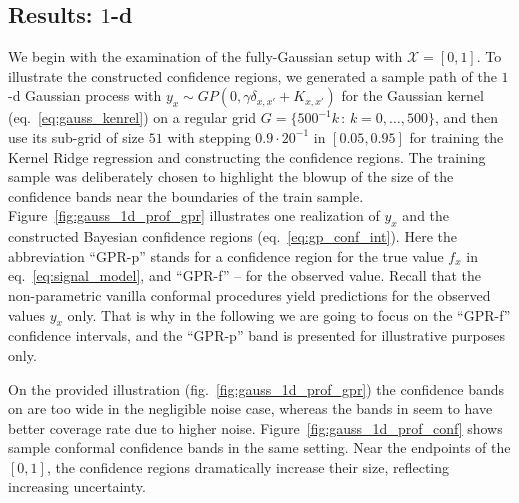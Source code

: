 \documentclass[a4paper,14pt]{extarticle}
\newcommand{\Xcal}{\mathcal{X}}
\begin{document}

\subsection{Results: $1$-d} %
\label{sub:results_1_d}

We begin with the examination of the fully-Gaussian setup with $\Xcal = [0, 1]$.
To illustrate the constructed confidence regions, we generated a sample path of
the $1$-d Gaussian process with $y_x\sim GP(0, \gamma \delta_{x,x'} + K_{x,x'})$
for the Gaussian kernel (eq.~\ref{eq:gauss_kenrel}) on a regular grid $G=\{500^{-1} k \,:\, k=0,
\ldots, 500\}$, and then use its sub-grid of size $51$ with stepping $0.9\cdot 20^{-1}$
in $[0.05, 0.95]$ for training the Kernel Ridge regression and constructing the
confidence regions. The training sample was deliberately chosen to highlight the
blowup of the size of the confidence bands near the boundaries of the train sample.
Figure~\ref{fig:gauss_1d_prof_gpr} illustrates one realization of $y_x$ and the
constructed Bayesian confidence regions (eq.~\ref{eq:gp_conf_int}). Here the abbreviation
``GPR-p'' stands for a confidence region for the true value $f_x$ in eq.~\ref{eq:signal_model},
and ``GPR-f'' -- for the observed value. Recall that the non-parametric vanilla
conformal procedures yield predictions for the observed values $y_x$ only. That
is why in the following we are going to focus on the ``GPR-f'' confidence intervals,
and the ``GPR-p'' band is presented for illustrative purposes only.

On the provided illustration (fig.~\ref{fig:gauss_1d_prof_gpr}) the confidence bands
on are too wide in the negligible noise case, whereas the bands in seem to have better
coverage rate due to higher noise. Figure~\ref{fig:gauss_1d_prof_conf} shows sample
conformal confidence bands in the same setting. Near the endpoints of the $[0,1]$,
the confidence regions dramatically increase their size, reflecting increasing uncertainty.
\end{document}
